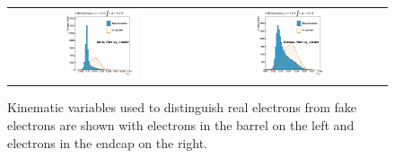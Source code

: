 \begin{figure}[!htb]
\begin{center}
\begin{tabular}{cc}
      \includegraphics[width=0.4\textwidth]{evtsel/figs/see_EB_LowPt.pdf} &
      \includegraphics[width=0.4\textwidth]{evtsel/figs/see_EE_LowPt.pdf} \\      
    \end{tabular}
    \caption{
      \label{fig:electron_mva_vars}
      Kinematic variables used to distinguish real electrons from fake electrons are shown
      with electrons in the barrel on the left and electrons in the endcap on the right.
    }
  \end{center}
\end{figure}
  
